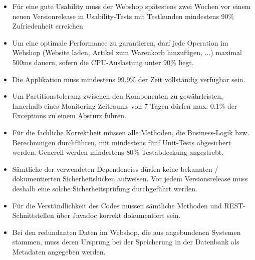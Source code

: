 \documentclass[
]{article}
\begin{document}
\begin{itemize}
\item Für eine gute Usability muss der Webshop spätestens zwei Wochen vor einem neuen Versionrelease in Usability-Tests mit Testkunden mindestens 90\% Zufriedenheit erreichen
\item Um eine optimale Performance zu garantieren, darf jede Operation im Webshop (Website laden, Artikel zum Warenkorb hinzufügen, ...) maximal 500ms dauern, sofern die CPU-Auslastung unter 90\% liegt.
\item Die Applikation muss mindestens 99.9\% der Zeit vollständig verfügbar sein.
\item Um Partitionstoleranz zwischen den Komponenten zu gewährleisten, Innerhalb eines Monitoring-Zeitraums von 7 Tagen dürfen max. 0.1\% der Exceptions zu einem Absturz führen.
\item  Für die fachliche Korrektheit müssen alle Methoden, die Business-Logik bzw. Berechnungen durchführen, mit mindestens fünf Unit-Tests abgesichert werden. Generell werden mindestens 80\% Testabdeckung angestrebt.
\item Sämtliche der verwendeten Dependencies dürfen keine bekannten / dokumentierten Sicherheitslücken aufweisen. Vor jedem Versionsrelease muss deshalb eine solche Sicherheitsprüfung durchgeführt werden.
\item  Für die Verständlichkeit des Codes müssen sämtliche Methoden und REST-Schnittstellen über Javadoc korrekt dokumentiert sein.
\item Bei den redundanten Daten im Webshop, die aus angebundenen Systemen stammen, muss deren Ursprung bei der Speicherung in der Datenbank als Metadaten angegeben werden.
\end{itemize}
\end{document}
